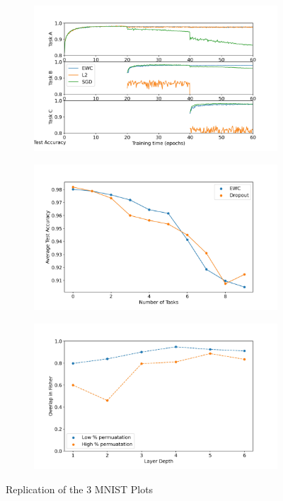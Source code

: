 \documentclass{article}
\begin{document}
\begin{figure}[!h]
     \centering
     \begin{subfigure}[b]{0.32\textwidth}
         \centering
         \includegraphics[width=\textwidth]{../Figures/Plot_a.jpg}
         \caption{}
         \label{fig:repa}
     \end{subfigure}
     \hfill
     \begin{subfigure}[b]{0.32\textwidth}
         \centering
         \includegraphics[width=\textwidth]{../Figures/Plot_b1.jpg}
         \caption{}
         \label{fig:repb}
     \end{subfigure}
     \hfill
     \begin{subfigure}[b]{0.32\textwidth}
         \centering
         \includegraphics[width=\textwidth]{../Figures/Plot_c.jpg}
         \caption{}
         \label{fig:repc}
     \end{subfigure}
        \caption{Replication of the 3 MNIST Plots}
        \label{fig:rep}
\end{figure}
\end{document}

